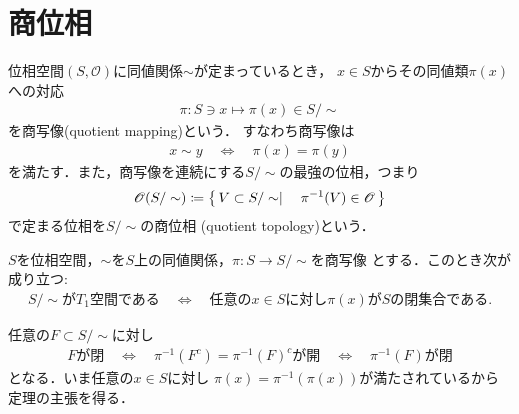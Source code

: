 \section{商位相}
	\begin{screen}
		\begin{thm}[商位相]
			位相空間$(S,\mathscr{O})$に同値関係$\sim$が定まっているとき，
			$x \in S$からその同値類$\pi(x)$への対応
			\begin{align}
				\pi: S \ni x \longmapsto \pi(x) \in S/\sim
			\end{align}
			を商写像(quotient mapping)という．
			すなわち商写像は
			\begin{align}
				x \sim y \quad \Longleftrightarrow \quad
				\pi(x) = \pi(y)
			\end{align}
			を満たす．また，商写像を連続にする$S/\sim$の最強の位相，つまり
			\begin{align}
				\mathscr{O}(S/\sim) \coloneqq
				\left\{\, V \subset S/\sim \mid \quad \pi^{-1}(V) \in \mathscr{O}\, \right\}
			\end{align}
			で定まる位相を$S/\sim$の商位相
			(quotient topology)という．
		\end{thm}
	\end{screen}
	
	\begin{screen}
		\begin{thm}
		\label{thm:quotient_space_T_1_iff_each_equivalence_class_closed}
			$S$を位相空間，$\sim$を$S$上の同値関係，$\pi:S \longrightarrow S/\sim$を商写像
			とする．このとき次が成り立つ:
			\begin{align}
				\mbox{$S/\sim$が$T_1$空間である}
				\quad \Longleftrightarrow \quad
				\mbox{任意の$x \in S$に対し$\pi(x)$が$S$の閉集合である}.
			\end{align}
		\end{thm}
	\end{screen}
	
	\begin{prf}
		任意の$F \subset S/\sim$に対し
		\begin{align}
			\mbox{$F$が閉} \quad \Longleftrightarrow \quad
			\mbox{$\pi^{-1}(F^c) = \pi^{-1}(F)^c$が開} \quad \Longleftrightarrow \quad
			\mbox{$\pi^{-1}(F)$が閉}
		\end{align}
		となる．いま任意の$x \in S$に対し
		$\pi(x) = \pi^{-1}(\pi(x))$が満たされているから定理の主張を得る．
		\QED
	\end{prf}
	
